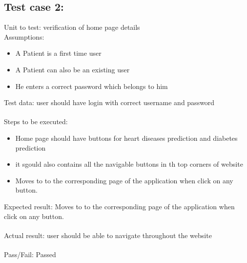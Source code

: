 \documentclass[oneside,12pt]{Classes/VTU}
\begin{document}
	\subsection{Test case 2:}
	Unit to test: verification of home page details\\
	Assumptions:\\
	\begin{itemize}
		\item A Patient is a first time user
		\item A Patient can also be an existing user
		\item He enters a correct password which belongs to him
	\end{itemize}
	Test data: user should have login with correct username and password\\
	\\
	Steps to be executed:\\
	\begin{itemize}
		\item Home page should have buttons for heart diseases prediction and diabetes prediction
		\item it sgould also contains all the navigable buttons in th top corners of website
		\item Moves to to the corresponding page of the application when click on any button.
	\end{itemize}
	Expected result:  Moves to to the corresponding page of the application when click on any button.\\
	\\
	Actual result: user should be able to navigate throughout the website\\
	\\
	Pass/Fail: Passed\\
	\\
	
\end{document}
